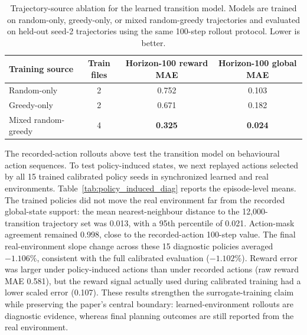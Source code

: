 \documentclass[11pt]{article}
\begin{document}
\begin{table}[htbp]
\centering
\scriptsize
\setlength{\tabcolsep}{4pt}
\caption{Trajectory-source ablation for the learned transition model. Models are trained on random-only, greedy-only, or mixed random-greedy trajectories and evaluated on held-out seed-2 trajectories using the same 100-step rollout protocol. Lower is better.}
\label{tab:source_ablation}
\begin{tabular}{lccc}
\toprule
Training source & Train files & Horizon-100 reward MAE & Horizon-100 global MAE \\
\midrule
Random-only & 2 & 0.752 & 0.103 \\
Greedy-only & 2 & 0.671 & 0.182 \\
Mixed random-greedy & 4 & \textbf{0.325} & \textbf{0.024} \\
\bottomrule
\end{tabular}
\end{table}

The recorded-action rollouts above test the transition model on behavioural action sequences. To test policy-induced states, we next replayed actions selected by all 15 trained calibrated policy seeds in synchronized learned and real environments. Table~\ref{tab:policy_induced_diag} reports the episode-level means. The trained policies did not move the real environment far from the recorded global-state support: the mean nearest-neighbour distance to the 12{,}000-transition trajectory set was 0.013, with a 95th percentile of 0.021. Action-mask agreement remained 0.998, close to the recorded-action 100-step value. The final real-environment slope change across these 15 diagnostic policies averaged $-1.106\%$, consistent with the full calibrated evaluation ($-1.102\%$). Reward error was larger under policy-induced actions than under recorded actions (raw reward MAE 0.581), but the reward signal actually used during calibrated training had a lower scaled error (0.107). These results strengthen the surrogate-training claim while preserving the paper's central boundary: learned-environment rollouts are diagnostic evidence, whereas final planning outcomes are still reported from the real environment.
\end{document}
